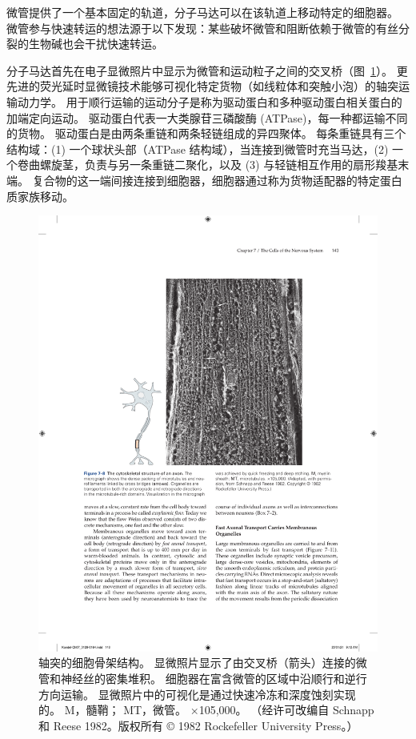微管提供了一个基本固定的轨道，分子马达可以在该轨道上移动特定的细胞器。
微管参与快速转运的想法源于以下发现：某些破坏微管和阻断依赖于微管的有丝分裂的生物碱也会干扰快速转运。


分子马达首先在电子显微照片中显示为微管和运动粒子之间的交叉桥（图~\ref{fig:7_8}）。
更先进的荧光延时显微镜技术能够可视化特定货物（如线粒体和突触小泡）的轴突运输动力学。
用于顺行运输的运动分子是称为驱动蛋白和多种驱动蛋白相关蛋白的加端定向运动。
驱动蛋白代表一大类腺苷三磷酸酶 (ATPase)，每一种都运输不同的货物。
驱动蛋白是由两条重链和两条轻链组成的异四聚体。
每条重链具有三个结构域：(1) 一个球状头部（ATPase 结构域），当连接到微管时充当马达，(2) 一个卷曲螺旋茎，负责与另一条重链二聚化，以及 (3) 与轻链相互作用的扇形羧基末端。
复合物的这一端间接连接到细胞器，细胞器通过称为货物适配器的特定蛋白质家族移动。


\begin{figure}[htbp]
	\centering
	\includegraphics[width=1.0\linewidth]{chap07/fig_7_8}
	\caption{轴突的细胞骨架结构。 显微照片显示了由交叉桥（箭头）连接的微管和神经丝的密集堆积。 细胞器在富含微管的区域中沿顺行和逆行方向运输。 显微照片中的可视化是通过快速冷冻和深度蚀刻实现的。 M，髓鞘； MT，微管。 ×105,000。 （经许可改编自 Schnapp 和 Reese 1982。版权所有 © 1982 Rockefeller University Press。）}
	\label{fig:7_8}
\end{figure}


